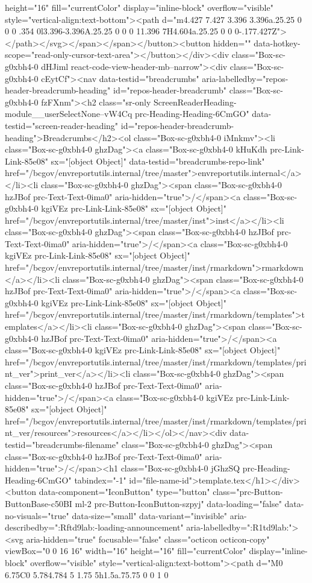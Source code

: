 {{{{{{{{{{{{{{{{{{{{{{{{{{{{{{{height="16" fill="currentColor" display="inline-block" overflow="visible" style="vertical-align:text-bottom"><path d="m4.427 7.427 3.396 3.396a.25.25 0 0 0 .354 0l3.396-3.396A.25.25 0 0 0 11.396 7H4.604a.25.25 0 0 0-.177.427Z"></path></svg></span></span></button><button hidden="" data-hotkey-scope="read-only-cursor-text-area"></button></div><div class="Box-sc-g0xbh4-0 dHJiml react-code-view-header-mb--narrow"><div class="Box-sc-g0xbh4-0 cEytCf"><nav data-testid="breadcrumbs" aria-labelledby="repos-header-breadcrumb-heading" id="repos-header-breadcrumb" class="Box-sc-g0xbh4-0 fzFXnm"><h2 class="sr-only ScreenReaderHeading-module__userSelectNone--vW4Cq prc-Heading-Heading-6CmGO" data-testid="screen-reader-heading" id="repos-header-breadcrumb-heading">Breadcrumbs</h2><ol class="Box-sc-g0xbh4-0 iMnkmv"><li class="Box-sc-g0xbh4-0 ghzDag"><a class="Box-sc-g0xbh4-0 kHuKdh prc-Link-Link-85e08" sx="[object Object]" data-testid="breadcrumbs-repo-link" href="/bcgov/envreportutils.internal/tree/master">envreportutils.internal</a></li><li class="Box-sc-g0xbh4-0 ghzDag"><span class="Box-sc-g0xbh4-0 hzJBof prc-Text-Text-0ima0" aria-hidden="true">/</span><a class="Box-sc-g0xbh4-0 kgiVEz prc-Link-Link-85e08" sx="[object Object]" href="/bcgov/envreportutils.internal/tree/master/inst">inst</a></li><li class="Box-sc-g0xbh4-0 ghzDag"><span class="Box-sc-g0xbh4-0 hzJBof prc-Text-Text-0ima0" aria-hidden="true">/</span><a class="Box-sc-g0xbh4-0 kgiVEz prc-Link-Link-85e08" sx="[object Object]" href="/bcgov/envreportutils.internal/tree/master/inst/rmarkdown">rmarkdown</a></li><li class="Box-sc-g0xbh4-0 ghzDag"><span class="Box-sc-g0xbh4-0 hzJBof prc-Text-Text-0ima0" aria-hidden="true">/</span><a class="Box-sc-g0xbh4-0 kgiVEz prc-Link-Link-85e08" sx="[object Object]" href="/bcgov/envreportutils.internal/tree/master/inst/rmarkdown/templates">templates</a></li><li class="Box-sc-g0xbh4-0 ghzDag"><span class="Box-sc-g0xbh4-0 hzJBof prc-Text-Text-0ima0" aria-hidden="true">/</span><a class="Box-sc-g0xbh4-0 kgiVEz prc-Link-Link-85e08" sx="[object Object]" href="/bcgov/envreportutils.internal/tree/master/inst/rmarkdown/templates/print_ver">print_ver</a></li><li class="Box-sc-g0xbh4-0 ghzDag"><span class="Box-sc-g0xbh4-0 hzJBof prc-Text-Text-0ima0" aria-hidden="true">/</span><a class="Box-sc-g0xbh4-0 kgiVEz prc-Link-Link-85e08" sx="[object Object]" href="/bcgov/envreportutils.internal/tree/master/inst/rmarkdown/templates/print_ver/resources">resources</a></li></ol></nav><div data-testid="breadcrumbs-filename" class="Box-sc-g0xbh4-0 ghzDag"><span class="Box-sc-g0xbh4-0 hzJBof prc-Text-Text-0ima0" aria-hidden="true">/</span><h1 class="Box-sc-g0xbh4-0 jGhzSQ prc-Heading-Heading-6CmGO" tabindex="-1" id="file-name-id">template.tex</h1></div><button data-component="IconButton" type="button" class="prc-Button-ButtonBase-c50BI ml-2 prc-Button-IconButton-szpyj" data-loading="false" data-no-visuals="true" data-size="small" data-variant="invisible" aria-describedby=":Rftd9lab:-loading-announcement" aria-labelledby=":R1td9lab:"><svg aria-hidden="true" focusable="false" class="octicon octicon-copy" viewBox="0 0 16 16" width="16" height="16" fill="currentColor" display="inline-block" overflow="visible" style="vertical-align:text-bottom"><path d="M0 6.75C0 5.784.784 5 1.75 5h1.5a.75.75 0 0 1 0 }}}}}}}}}}}}}}}}}}}}}}}}}}}}}}}
